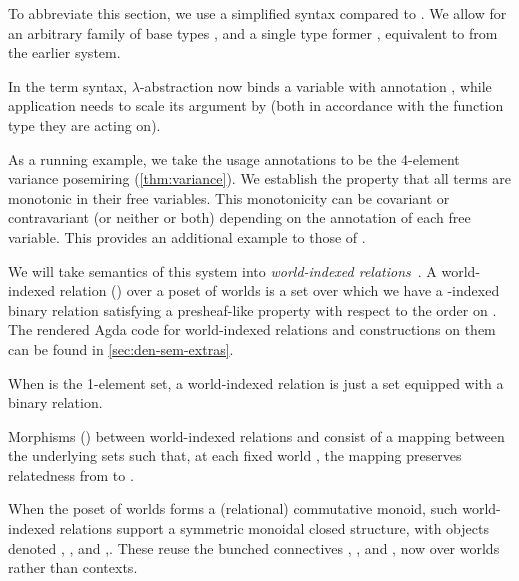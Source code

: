 To abbreviate this section, we use a simplified syntax compared to \name{}.
We allow for an arbitrary family of base types , and a single
type former \mbox{}, equivalent to
\mbox{} from the earlier system.


In the term syntax, $\lambda$-abstraction now binds a variable with annotation
, while application needs to scale its argument by 
(both in accordance with the function type they are acting on).


As a running example, we take the usage annotations to be the 4-element
variance posemiring (\cref{thm:variance}).
We establish the property that all terms are monotonic in their free variables.
This monotonicity can be covariant or contravariant (or neither or both)
depending on the annotation of each free variable.
This provides an additional example to those of \citeauthor{AbelBernardy2020}.

We will take semantics of this system into
\emph{world-indexed relations}~\cite{AbelBernardy2020,context-constrained}.
A world-indexed relation () over a poset of worlds
 is a set over which
we have a -indexed binary relation satisfying a presheaf-like
property with respect to the order on .
The rendered Agda code for world-indexed relations and constructions on them
can be found in \cref{sec:den-sem-extras}.

\begin{example}
  When  is the 1-element set, a world-indexed relation is just a
  set equipped with a binary relation.
\end{example}

Morphisms () between world-indexed relations 
and  consist of a mapping between the underlying sets such that, at
each fixed world , the mapping preserves relatedness from
 to .

When the poset of worlds forms a (relational) commutative monoid, such
world-indexed relations support a symmetric monoidal closed structure, with
objects denoted ,
, and
,.
These reuse the bunched connectives , \AgdaRecord{$\sep$}, and
\AgdaRecord{$\wand$}, now over worlds rather than contexts.

